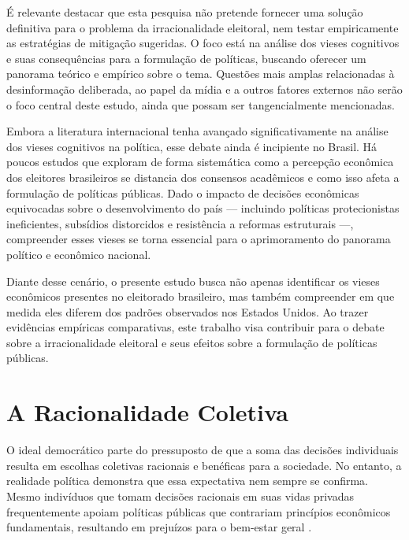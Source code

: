 É relevante destacar que esta pesquisa não pretende fornecer uma solução definitiva para o problema da irracionalidade eleitoral, nem testar empiricamente as estratégias de mitigação sugeridas. O foco está na análise dos vieses cognitivos e suas consequências para a formulação de políticas, buscando oferecer um panorama teórico e empírico sobre o tema. Questões mais amplas relacionadas à desinformação deliberada, ao papel da mídia e a outros fatores externos não serão o foco central deste estudo, ainda que possam ser tangencialmente mencionadas.

Embora a literatura internacional tenha avançado significativamente na análise dos vieses cognitivos na política, esse debate ainda é incipiente no Brasil. Há poucos estudos que exploram de forma sistemática como a percepção econômica dos eleitores brasileiros se distancia dos consensos acadêmicos e como isso afeta a formulação de políticas públicas. Dado o impacto de decisões econômicas equivocadas sobre o desenvolvimento do país — incluindo políticas protecionistas ineficientes, subsídios distorcidos e resistência a reformas estruturais —, compreender esses vieses se torna essencial para o aprimoramento do panorama político e econômico nacional.

Diante desse cenário, o presente estudo busca não apenas identificar os vieses econômicos presentes no eleitorado brasileiro, mas também compreender em que medida eles diferem dos padrões observados nos Estados Unidos. Ao trazer evidências empíricas comparativas, este trabalho visa contribuir para o debate sobre a irracionalidade eleitoral e seus efeitos sobre a formulação de políticas públicas.


\section{A Racionalidade Coletiva} %


O ideal democrático parte do pressuposto de que a soma das decisões individuais resulta em escolhas coletivas racionais e benéficas para a sociedade. No entanto, a realidade política demonstra que essa expectativa nem sempre se confirma. Mesmo indivíduos que tomam decisões racionais em suas vidas privadas frequentemente apoiam políticas públicas que contrariam princípios econômicos fundamentais, resultando em prejuízos para o bem-estar geral \cite{downs1957economic,The_Myth_of_the_Rational_Voter}.  

